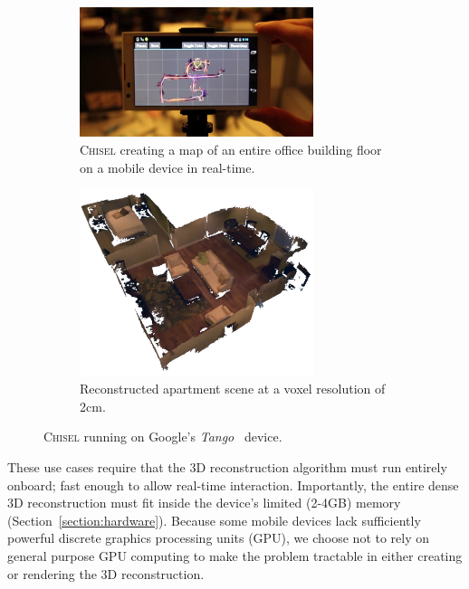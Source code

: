 \documentclass[conference]{IEEEtran}
\newcommand{\sref}[1]{Section~\ref{#1}}
\newcommand{\Tango}{\textit{Tango}\xspace}
\newcommand{\chisel}{\textsc{Chisel}\xspace}
\begin{document}
\begin{figure}[t!]
  \centering
    	 \begin{subfigure}{\linewidth} \centering
		 \includegraphics[width=0.75\textwidth]{img/mapdevice}
		 \caption{\chisel creating a map
      of an entire office building floor on a mobile device in real-time.}
		 \label{fig:map_device}
	 \end{subfigure}
      	 \begin{subfigure}{\linewidth} \centering
		 \includegraphics[width=0.75\textwidth]{img/apartment_scene_color.png}
		 \caption{Reconstructed apartment scene at a voxel resolution of 2cm.}
		 \label{fig:apartment_color}
	 \end{subfigure}
      \caption{\chisel running on Google's \Tango~\cite{Tango} device.}
  \label{fig:first_figure}
\end{figure} 

These use cases require that the 3D reconstruction algorithm must run entirely
onboard; fast enough to allow real-time interaction. Importantly, the entire
dense 3D reconstruction must fit inside the device's limited (2-4GB) memory
(\sref{section:hardware}). Because some mobile devices  lack sufficiently
powerful discrete graphics processing units (GPU), we choose not to rely on general
purpose GPU computing to make the problem tractable in either creating or
rendering the 3D reconstruction.
\end{document}
